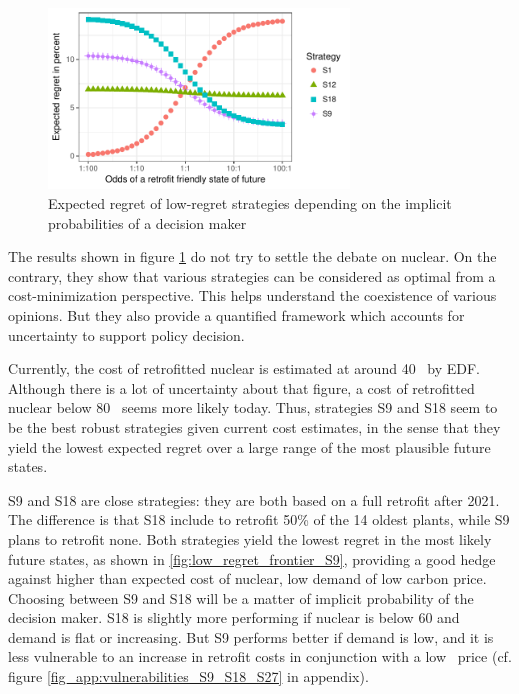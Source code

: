 \begin{figure}[!ht]
	\centering
	\includegraphics[width=8cm]{figures/odds_S9.pdf}
	\caption{Expected regret of low-regret strategies depending on the implicit probabilities of a decision maker}
	\label{fig:odds_S9}
\end{figure}

The results shown in figure \ref{fig:odds_S9} do not try to settle the debate on nuclear. On the contrary, they show that various strategies can be considered as optimal from a cost-minimization perspective. This helps understand the coexistence of various opinions. But they also provide a quantified framework which accounts for uncertainty to support policy decision. 

Currently, the cost of retrofitted nuclear is estimated at around 40 \emwh\ by EDF. Although there is a lot of uncertainty about that figure, a cost of retrofitted nuclear below 80 \emwh\ seems more likely today. Thus, strategies S9 and S18 seem to be the best robust strategies given current cost estimates, in the sense that they yield the lowest expected regret over a large range of the most plausible future states.

S9 and S18 are close strategies: they are both based on a full retrofit after 2021. The difference is that S18 include to retrofit 50\% of the 14 oldest plants, while S9 plans to retrofit none. 
Both strategies yield the lowest regret in the most likely future states, as shown in \ref{fig:low_regret_frontier_S9}, providing a good hedge against higher than expected cost of nuclear, low demand of low carbon price. 
Choosing between S9 and S18 will be a matter of implicit probability of the decision maker. S18 is slightly more performing if nuclear is below 60 \emwh and demand is flat or increasing. But S9 performs better if demand is low, and it is less vulnerable to an increase in retrofit costs in conjunction with a low \coo\ price (cf. figure \ref{fig_app:vulnerabilities_S9_S18_S27} in appendix).

